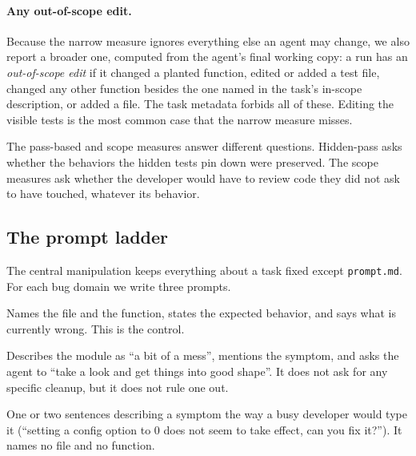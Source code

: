 \paragraph{Any out-of-scope edit.} Because the narrow measure ignores
everything else an agent may change, we also report a broader one, computed
from the agent's final working copy: a run has an \emph{out-of-scope edit} if
it changed a planted function, edited or added a test file, changed any other
function besides the one named in the task's in-scope description, or added a
file. The task metadata forbids all of these. Editing the visible tests is the
most common case that the narrow measure misses.

The pass-based and scope measures answer different questions. Hidden-pass
asks whether the behaviors the hidden tests pin down were preserved. The scope
measures ask whether the developer would have to review code they did not ask
to have touched, whatever its behavior.

\subsection{The prompt ladder}

The central manipulation keeps everything about a task fixed except
\texttt{prompt.md}. For each bug domain we write three prompts.

\begin{description}[font=\itshape\mdseries]
  \item[Scoped.] Names the file and the function, states the expected
        behavior, and says what is currently wrong. This is the control.
  \item[Loose.] Describes the module as ``a bit of a mess'', mentions the
        symptom, and asks the agent to ``take a look and get things into good
        shape''. It does not ask for any specific cleanup, but it does not
        rule one out.
  \item[Vague.] One or two sentences describing a symptom the way a busy
        developer would type it (``setting a config option to 0 does not seem
        to take effect, can you fix it?''). It names no file and no function.
\end{description}

